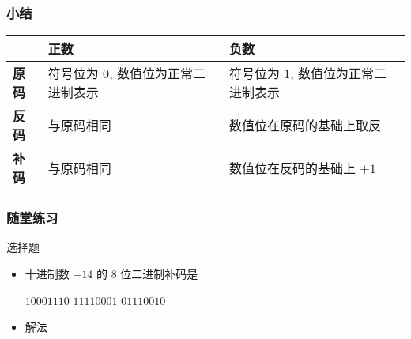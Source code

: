 \begin{frame}[fragile]
    \frametitle{小结}

    \begin{table}[!ht]
        \centering
        \renewcommand{\arraystretch}{1.5} %
        \begin{tabular}{p{1cm}p{4cm}p{4cm}}
        \hline
            \textbf{} & \textbf{正数} & \textbf{负数} \\ \hline
            \textbf{原码} & 符号位为 $0$, 数值位为正常二进制表示 & 符号位为 $1$, 数值位为正常二进制表示 \\ 
            \textbf{反码} & 与原码相同 & 数值位在原码的基础上取反 \\ 
            \textbf{补码} & 与原码相同 & 数值位在反码的基础上 $+ 1$ \\ \hline
        \end{tabular}
    \end{table}

\end{frame}

\begin{frame}[fragile]
    \frametitle{随堂练习}

    \begin{exampleblock}{选择题}

        \begin{itemize}
            \item 十进制数 $-14$ 的 $8$ 位二进制补码是
            
                \begin{tasks}
                    \task[A.] $10001110$
                    \task[B.] $11110001$
                    \task[C.] 
                    \task[D.] $01110010$
                \end{tasks}
                
            \item<3-> 解法
            
            
        \end{itemize}

    \end{exampleblock}

\end{frame}

